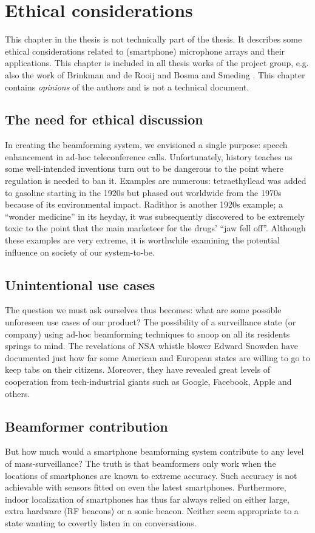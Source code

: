 \chapter{Ethical considerations}
\label{app:ethical}

This chapter in the thesis is not technically part of the thesis.
It describes some ethical considerations related to (smartphone) microphone arrays and their applications.
This chapter is included in all thesis works of the project group, e.g. also the work of Brinkman and de Rooij \cite{BAP:RosalieTim} and Bosma and Smeding \cite{BAP:RoySjoerd}. This chapter contains \emph{opinions} of the authors and is not a technical document.

\section{The need for ethical discussion}
In creating the beamforming system, we envisioned a single purpose: speech enhancement in ad-hoc teleconference calls. Unfortunately, history teaches us some well-intended inventions turn out to be dangerous to the point where regulation is needed to ban it. Examples are numerous: tetraethyllead was added to gasoline starting in the 1920s but phased out worldwide from the 1970s because of its environmental impact. Radithor is another 1920s example; a ``wonder medicine'' in its heyday, it was subsequently discovered to be extremely toxic to the point that the main marketeer for the drugs' ``jaw fell off''.
Although these examples are very extreme, it is worthwhile examining the potential influence on society of our system-to-be.

\section{Unintentional use cases}
The question we must ask ourselves thus becomes: what are some possible unforeseen use cases of our product? The possibility of a surveillance state (or company) using ad-hoc beamforming techniques to snoop on all its residents springs to mind. The revelations of NSA whistle blower Edward Snowden have documented just how far some American and European states are willing to go to keep tabs on their citizens. Moreover, they have revealed great levels of cooperation from tech-industrial giants such as Google, Facebook, Apple and others.

\section{Beamformer contribution}
But how much would a smartphone beamforming system contribute to any level of mass-surveillance? The truth is that beamformers only work when the locations of smartphones are known to extreme accuracy. Such accuracy is not achievable with sensors fitted on even the latest smartphones. Furthermore, indoor localization of smartphones has thus far always relied on either large, extra hardware (RF beacons) or a sonic beacon. Neither seem appropriate to a state wanting to covertly listen in on conversations.

